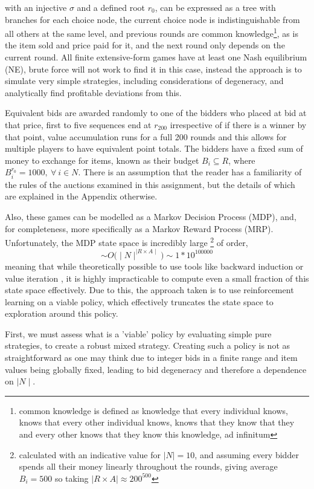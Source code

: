 \documentclass[10pt,conference,twocolumn]{IEEEtran}
\begin{document}
with an injective $\sigma$ and a defined root $r_0$, can be expressed as a tree with branches for each choice node, the current choice node is indistinguishable from all others at the same level, and previous rounds are common knowledge\footnote{common knowledge is defined as knowledge that every individual knows, knows that every other individual knows, knows that they know that they and every other knows that they know this knowledge, ad infinitum }, as is the item sold and price paid for it, and the next round only depends on the current round. All finite extensive-form games have at least one Nash equilibrium (NE), brute force will not work to find it in this case, instead the approach is to simulate very simple strategies, including considerations of degeneracy, and analytically find profitable deviations from this. 

Equivalent bids are awarded randomly to one of the bidders who placed at bid at that price, first to five sequences end at $ r_{200}$ irrespective of if there is a winner by that point, value accumulation runs for a full 200 rounds and this allows for multiple players to have equivalent point totals. The bidders have a fixed sum of money to exchange for items, known as their budget $B_i \subseteq R$, where $B_i^{r_0} = 1000, \: \forall \: i \in N$. There is an assumption that the reader has a familiarity of the rules of the auctions examined in this assignment, but the details of which are explained in the Appendix otherwise.

Also, these games can be modelled as a Markov Decision Process (MDP), and, for completeness, more specifically as a Markov Reward Process (MRP). Unfortunately, the MDP state space is incredibly large \footnote{calculated with an indicative value for $\mid N \mid = 10$, and assuming every bidder spends all their money linearly throughout the rounds, giving average $B_i = 500$ so taking $\mid R \times A \mid \approx 200^{500}$} of order, $$\sim O\big(\mid N\mid^{ \mid R \times A \mid}\big) \sim 1*10^{100000}$$
meaning that while theoretically possible to use tools like backward induction\cite{textbook} or value iteration\cite{textbook} , it is highly impracticable to compute even a small fraction of this state space effectively. Due to this, the approach taken is to use reinforcement learning on a viable policy, which effectively truncates the state space to exploration around this policy\cite{RL}. 

First, we must assess what is a 'viable' policy by evaluating simple pure strategies, to create a robust mixed strategy. Creating such a policy is not as straightforward as one may think due to integer bids in a finite range and item values being globally fixed, leading to bid degeneracy and therefore a dependence on $\mid N\mid$. 
\end{document}
